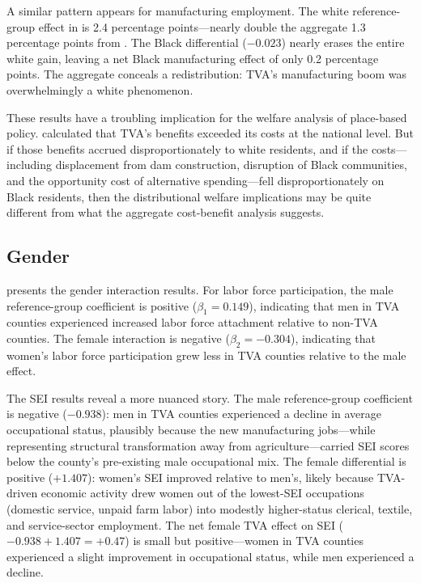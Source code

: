 \documentclass[12pt]{article}
\begin{document}
A similar pattern appears for manufacturing employment. The white reference-group effect in  is 2.4 percentage points---nearly double the aggregate 1.3 percentage points from . The Black differential ($-0.023$) nearly erases the entire white gain, leaving a net Black manufacturing effect of only 0.2 percentage points. The aggregate conceals a redistribution: TVA's manufacturing boom was overwhelmingly a white phenomenon.

These results have a troubling implication for the welfare analysis of place-based policy. \citet{kline2014} calculated that TVA's benefits exceeded its costs at the national level. But if those benefits accrued disproportionately to white residents, and if the costs---including displacement from dam construction, disruption of Black communities, and the opportunity cost of alternative spending---fell disproportionately on Black residents, then the distributional welfare implications may be quite different from what the aggregate cost-benefit analysis suggests.

\subsection{Gender}

 presents the gender interaction results. For labor force participation, the male reference-group coefficient is positive ($\beta_1 = 0.149$), indicating that men in TVA counties experienced increased labor force attachment relative to non-TVA counties. The female interaction is negative ($\beta_2 = -0.304$), indicating that women's labor force participation grew less in TVA counties relative to the male effect.

The SEI results reveal a more nuanced story. The male reference-group coefficient is negative ($-0.938$): men in TVA counties experienced a decline in average occupational status, plausibly because the new manufacturing jobs---while representing structural transformation away from agriculture---carried SEI scores below the county's pre-existing male occupational mix. The female differential is positive ($+1.407$): women's SEI improved relative to men's, likely because TVA-driven economic activity drew women out of the lowest-SEI occupations (domestic service, unpaid farm labor) into modestly higher-status clerical, textile, and service-sector employment. The net female TVA effect on SEI ($-0.938 + 1.407 = +0.47$) is small but positive---women in TVA counties experienced a slight improvement in occupational status, while men experienced a decline.
\end{document}

